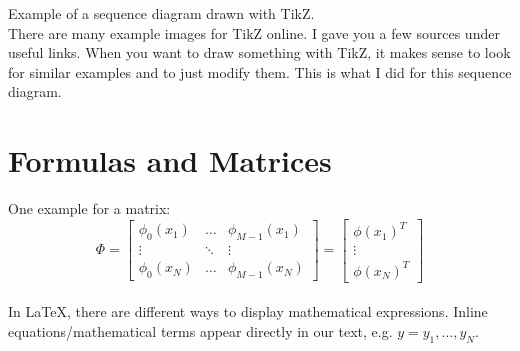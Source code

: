 \documentclass[10pt,parskip=half]{scrartcl}
\newcommand{\vk}{\ensuremath{\mathit{VK}}}
\newcommand{\sk}{\ensuremath{\mathit{SK}}}
\begin{document}

Example of a sequence diagram drawn with TikZ. \\

There are many example images for TikZ online. I gave you a few sources under useful links. When you want to draw something with TikZ, it makes sense to look for similar examples and to just modify them. This is what I did for this sequence diagram.

\section{Formulas and Matrices}

One example for a matrix: \\

\[\Phi = \begin{bmatrix} 
	\phi_0(x_1) & \dots  & \phi_{M-1}(x_1)\\
	\vdots & \ddots & \vdots\\
	\phi_0(x_N) & \dots  & \phi_{M-1}(x_N) 
\end{bmatrix}
= \begin{bmatrix} 
	\phi(x_1)^T \\
	\vdots \\
	\phi(x_N)^T
\end{bmatrix}
\] \\


In LaTeX, there are different ways to display mathematical expressions. Inline equations/mathematical terms appear directly in our text, e.g. $y = {y_1,\ldots ,y_N}$. \\ 
\end{document}
